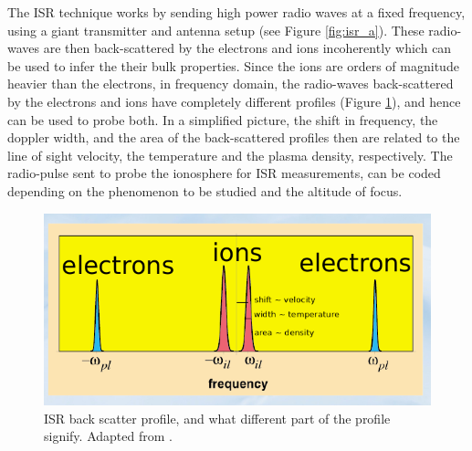 \documentclass[crop=false,class=mitthesis,oneside,font=12pt]{standalone}
\begin{document}
The ISR technique works by sending high power radio waves at a fixed frequency, using a giant transmitter and antenna setup (see Figure \ref{fig:isr_a}). These radio-waves are then back-scattered by the electrons and ions incoherently which can be used to infer the their bulk properties. Since the ions are orders of magnitude heavier than the electrons, in frequency domain, the radio-waves back-scattered by the electrons and ions have completely different profiles (Figure \ref{fig:isr}), and hence can be used to probe both. In a simplified picture, the shift in frequency, the doppler width, and the area of the back-scattered profiles then are related to the line of sight velocity, the temperature and the plasma density, respectively. The radio-pulse sent to probe the ionosphere for ISR measurements, can be coded depending on the phenomenon to be studied and the altitude of focus.
\begin{figure}[H]
	\centering\includegraphics[width=30pc]{isr.png}
	\caption{ISR back scatter profile, and what different part of the profile signify. Adapted from \cite{anja}.}
	\label{fig:isr}
\end{figure}
\end{document}

